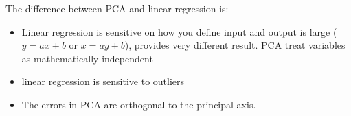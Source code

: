 \documentclass[a4paper,10pt]{article}
\begin{document}
The difference between PCA and linear regression is:
\begin{itemize}
    \item Linear regression is sensitive on how you define input and output is large ($y=ax+b$ or $x = ay+b$), provides very different result. PCA treat variables as mathematically independent
    \item linear regression is sensitive to outliers
    \item The errors in PCA are orthogonal to the principal axis.
\end{itemize}

\end{document}
